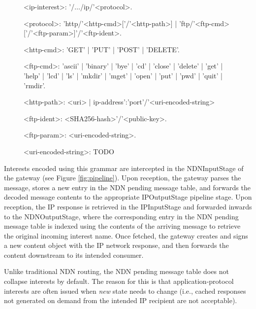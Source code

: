 \begin{figure}
\begin{mdframed}
\begingrammar
\noindent
<ip-interest>:	'/$\dots$/ip/'<protocol>.

<protocol>:	'http/'<http-cmd>[{'/'<http-path>}] | 'ftp/'<ftp-cmd>[{'/'<ftp-param>}]'/'<ftp-ident>.

<http-cmd>: 'GET' | 'PUT' | 'POST' | 'DELETE'.

<ftp-cmd>: 'ascii' | 'binary' | 'bye' | 'cd' | 'close' | 'delete' | 'get' | 'help' | 'lcd' | 'ls' | 'mkdir' | 'mget' | 'open' | 'put' | 'pwd' | 'quit' | 'rmdir'.

<http-path>: <uri> | ip-address{':'port}{'/'<uri-encoded-string>}

<ftp-ident>: <SHA256-hash>'/'<public-key>.

<ftp-param>: <uri-encoded-string>.

<uri-encoded-string>: TODO



		
\endgrammar
\end{mdframed}
\end{figure}

Interests encoded using this grammar are intercepted in the NDNInputStage of the gateway (see Figure \ref{fig:pipeline}). Upon reception, the gateway parses the message, stores a new entry in the NDN pending message table, and forwards the decoded message contents to the appropriate IPOutputStage pipeline stage. Upon reception, the IP response is retrieved in the IPInputStage and forwarded inwards to the NDNOutputStage, where the corresponding entry in the NDN pending message table is indexed using the contents of the arriving message to retrieve the original incoming interest name. Once fetched, the gateway creates and signs a new content object with the IP network response, and then forwards the content downstream to its intended consumer. 

Unlike traditional NDN routing, the NDN pending message table does not collapse interests by default. The reason for this is that application-protocol interests are often issued when \emph{new} state needs to change (i.e., cached responses not generated on demand from the intended IP recipient are not acceptable). 


